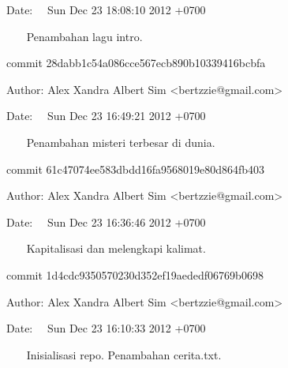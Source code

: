 {\fontsize{10pt}{10pt}\selectfont Date:~~ Sun Dec 23 18:08:10 2012 +0700} \par
\vspace{10pt}
{\fontsize{10pt}{10pt}\selectfont ~~~ Penambahan lagu intro.} \par
\vspace{10pt}
{\fontsize{10pt}{10pt}\selectfont commit 28dabb1c54a086cce567ecb890b10339416bcbfa} \par
{\fontsize{10pt}{10pt}\selectfont Author: Alex Xandra Albert Sim <bertzzie@gmail.com>} \par
{\fontsize{10pt}{10pt}\selectfont Date:~~ Sun Dec 23 16:49:21 2012 +0700} \par
\vspace{10pt}
{\fontsize{10pt}{10pt}\selectfont ~~~ Penambahan misteri terbesar di dunia.} \par
\vspace{10pt}
{\fontsize{10pt}{10pt}\selectfont commit 61c47074ee583dbdd16fa9568019e80d864fb403} \par
{\fontsize{10pt}{10pt}\selectfont Author: Alex Xandra Albert Sim <bertzzie@gmail.com>} \par
{\fontsize{10pt}{10pt}\selectfont Date:~~ Sun Dec 23 16:36:46 2012 +0700} \par
\vspace{10pt}
{\fontsize{10pt}{10pt}\selectfont ~~~ Kapitalisasi dan melengkapi kalimat.} \par
\vspace{10pt}
{\fontsize{10pt}{10pt}\selectfont commit 1d4cdc9350570230d352ef19aededf06769b0698} \par
{\fontsize{10pt}{10pt}\selectfont Author: Alex Xandra Albert Sim <bertzzie@gmail.com>} \par
{\fontsize{10pt}{10pt}\selectfont Date:~~ Sun Dec 23 16:10:33 2012 +0700} \par
\vspace{10pt}
{\fontsize{10pt}{10pt}\selectfont ~~~ Inisialisasi repo. Penambahan cerita.txt.} 

